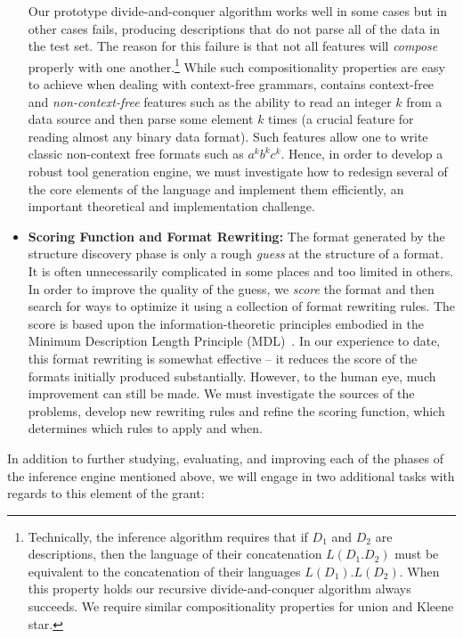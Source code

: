 \begin{itemize}
Our prototype divide-and-conquer algorithm
works well in some cases but in other cases fails, producing \pads{} 
descriptions that do not parse all of the data in the test set.
The reason for this failure is that not all \pads{} features will 
{\em compose} properly with one another.\footnote{Technically, the
inference algorithm requires
that if $D_1$ and $D_2$ are \pads{} descriptions, then the language of their
concatenation $L(D_1 . D_2)$ must be equivalent to the concatenation
of their languages $L(D_1) . L(D_2)$.  When this property holds our
recursive divide-and-conquer algorithm always succeeds.  We require
similar compositionality properties for union and Kleene star.}  
While such compositionality properties are easy to achieve when dealing with
context-free grammars, \pads{} contains context-free and 
{\em non-context-free} features
such as the ability to read an integer $k$ from a data source
and then parse some element $k$ times (a crucial feature for reading
almost any binary data format).  Such features allow one to
write classic non-context free formats such as $a^k b^k c^k$.
Hence, in order to develop a robust tool generation engine, we must
investigate how to redesign several of the core elements of 
the \pads{} language and implement them efficiently, an important
theoretical and implementation challenge.

\item {\bf Scoring Function and Format Rewriting:}
The format generated by the structure discovery phase is only a 
rough {\em guess}
at the structure of a format.  It is often unnecessarily complicated
in some places and too limited in others.  In order to improve the 
quality of the guess, we {\em score} the format and then search for ways
to optimize it using a collection of format rewriting rules.  The
score is based upon the information-theoretic principles embodied in
the Minimum Description Length Principle (MDL)~\cite{mdl}.  In our
experience to date, this format rewriting is somewhat effective --
it reduces the score of the formats initially produced substantially.
However, to the human eye, much improvement can still be made.  We must
investigate the sources of the problems, develop new rewriting rules
and refine the scoring function, which determines which rules to apply and
when. 
\end{itemize}

In addition to further studying, evaluating, and improving each of the phases
of the inference engine mentioned above, we will engage in two additional
tasks with regards to this element of the grant:

